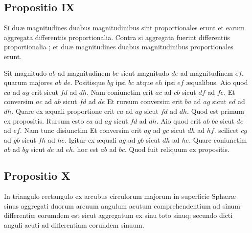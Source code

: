 \documentclass[11pt,a4paper]{article}
\begin{document}
\subsection*{Propositio IX}

Si duæ magnitudines duabus magnitudinibus sint proportionales erunt et earum aggregata differentiis proportionalia. Contra si aggregata fuerint differentiis proportionalia ; et duæ magnitudines duabus magnitudinibus proportionales erunt.

Sit magnitudo $ab$ ad magnitudinem $bc$ sicut magnitudo $de$ ad magnitudinem $ef$. quarum majores $ab$ $de$. Positisque $bg$ ipsi $bc$ atque $eh$ ipsi $ef$ æqualibus. Aio quod $ca$ ad $ag$ erit sicut $fd$ ad $dh$. Nam coniunctim erit $ac$ ad $cb$ sicut $df$ ad $fe$. Et conversim $ac$ ad $ab$ sicut $fd$ ad $de$ Et rursum conversim erit $ba$ ad $ag$ sicut $ed$ ad $dh$. Quare ex æquali proportione erit $ca$ ad $ag$ sicut $fd$ ad $dh$. Quod est primum ex propositis. Rursum esto $ca$ ad $ag$ sicut $fd$ ad $dh$. Aio quod erit $ab$  $bc$ sicut $de$ ad $ef$. Nam tunc disiunctim Et conversim erit $ag$ ad $gc$ sicut $dh$ ad $hf$. scilicet $cg$ ad $gb$ sicut $fh$ ad $he$. Igitur ex æquali $ag$ ad $gb$ sicut $dh$ ad $he$. Quare coniunctim $ab$ ad $bg$ sicut $de$ ad $eh$. hoc est $ab$ ad $bc$. Quod fuit reliquum ex propositis.

\subsection*{Propositio X}

In triangulo rectangulo ex arcubus circulorum majorum in superficie Sphæræ sinus aggregati duorum arcuum angulum acutum comprehendentium ad sinum differentiæ eorumdem est sicut aggregatum ex sinu toto sinuq; secundo dicti anguli acuti ad differentiam eorundem sinuum.
\end{document}
